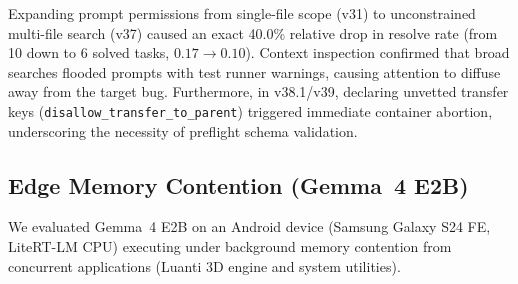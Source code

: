 \documentclass[10pt,twocolumn]{article}
\begin{document}
\begin{table}[t]
\centering
\small
\caption{Live Kaggle Competition Leaderboard Submissions ($4\times$ NVIDIA L4, 58 Benchmark Tasks).}
\label{tab:leaderboard}
\end{table}

Expanding prompt permissions from single-file scope (v31) to unconstrained multi-file search (v37) caused an exact 40.0\% relative drop in resolve rate (from 10 down to 6 solved tasks, $0.17 \to 0.10$). Context inspection confirmed that broad searches flooded prompts with test runner warnings, causing attention to diffuse away from the target bug. Furthermore, in v38.1/v39, declaring unvetted transfer keys (\texttt{disallow\_transfer\_to\_parent}) triggered immediate container abortion, underscoring the necessity of preflight schema validation.

\subsection{Edge Memory Contention (Gemma~4 E2B)}
We evaluated Gemma~4 E2B on an Android device (Samsung Galaxy S24 FE, LiteRT-LM CPU) executing under background memory contention from concurrent applications (Luanti 3D engine and system utilities).
\end{document}
